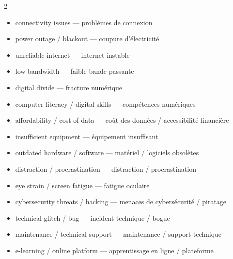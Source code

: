 \documentclass[11pt]{article}
\newcommand{\cle}[1]{{\popxbold\color{popdark}#1}}
\begin{document}
\begin{definition}
\begin{multicols}{2}
\begin{itemize}
  \item \cle{connectivity issues} — problèmes de connexion
  \item \cle{power outage / blackout} — coupure d'électricité
  \item \cle{unreliable internet} — internet instable
  \item \cle{low bandwidth} — faible bande passante
  \item \cle{digital divide} — fracture numérique
  \item \cle{computer literacy / digital skills} — compétences numériques
  \item \cle{affordability / cost of data} — coût des données / accessibilité financière
  \item \cle{insufficient equipment} — équipement insuffisant
  \item \cle{outdated hardware / software} — matériel / logiciels obsolètes
  \item \cle{distraction / procrastination} — distraction / procrastination
  \item \cle{eye strain / screen fatigue} — fatigue oculaire
  \item \cle{cybersecurity threats / hacking} — menaces de cybersécurité / piratage
  \item \cle{technical glitch / bug} — incident technique / bogue
  \item \cle{maintenance / technical support} — maintenance / support technique
  \item \cle{e-learning / online platform} — apprentissage en ligne / plateforme
\end{itemize}
\end{multicols}
\end{definition}
\end{document}
